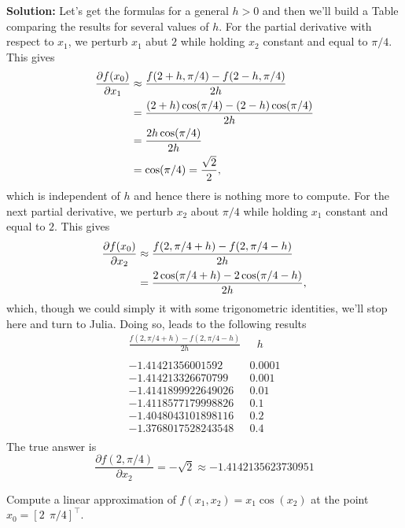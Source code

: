 \textbf{Solution:} Let's get the formulas for a general $h>0$ and then we'll build a Table comparing the results for several values of $h$. For the partial derivative with respect to $x_1$, we perturb $x_1$ abut $2$ while holding $x_2$ constant and equal to $\pi/4$. This gives
\begin{align*}
    \frac{\partial f(x_0)}{\partial x_1}& \approx\frac{f(2+h,\pi/4) - f(2-h,\pi/4)}{2h} \medskip \\
    &= \frac{ (2+h) \cos(\pi/4) - (2-h) \cos(\pi/4)}{2h} \medskip \\
        &= \frac{ 2h\cos(\pi/4)}{2h} \medskip \\
    &= \cos(\pi/4) = \frac{\sqrt{2}}{2},
\end{align*}
which is independent of $h$ and hence there is nothing more to compute. For the next partial derivative, we perturb $x_2$ about $\pi/4$ while holding $x_1$ constant and equal to $2$. This gives
\begin{equation}
\begin{aligned}
    \frac{\partial f(x_0)}{\partial x_2}&\approx \frac{f(2,\pi/4+h) - f(2,\pi/4-h)}{2h} \medskip \\
    &= \frac{ 2 \cos(\pi/4+h) - 2 \cos(\pi/4-h)}{2h},
\end{aligned}
\end{equation}
which, though we could simply it with some trigonometric identities, we'll stop here and turn to Julia. Doing so, leads to the following results
\begin{equation}
\begin{array}{ll}
\frac{f(2,\pi/4+h) - f(2,\pi/4-h)}{2h} & ~~~h \\
\\
-1.41421356001592 & 0.0001 \\
-1.414213326670799 & 0.001 \\
-1.4141899922649026 & 0.01 \\
-1.4118577179998826 & 0.1 \\
-1.4048043101898116 & 0.2 \\
-1.3768017528243548 & 0.4 \\
\end{array}
\end{equation}
The true answer is 
$$ \frac{\partial f(2, \pi/4)}{\partial x_2} = -\sqrt{2} \approx -1.4142135623730951 $$
\Qed

\vspace*{0.2cm}

\begin{example} 
\label{ex:Gradient} 
Compute a linear approximation of $f(x_1, x_2) = x_1 \cos(x_2)$ at the point $x_0=[2~~\pi/4]^\top$.
\end{example}

